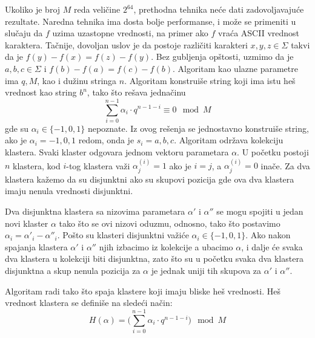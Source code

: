\noindent
\begin{minipage}[l]{\textwidth}

\end{minipage}

Ukoliko je broj $M$ reda veli\v cine $2^{64}$, prethodna tehnika ne\' ce dati zadovoljavaju\' ce rezultate. Naredna tehnika ima dosta bolje performanse, i mo\v ze se primeniti u slu\v caju da $f$ uzima uzastopne vrednosti, na primer ako $f$ vra\' ca ASCII vrednost karaktera. Ta\v cnije, dovoljan uslov je da postoje razli\v citi karakteri $x,y,z \in \Sigma$ takvi da je $f(y)-f(x) = f(z)-f(y)$. Bez gubljenja op\v stosti, uzmimo da je $a,b,c \in \Sigma$ i $f(b) - f(a) = f(c) - f(b)$. Algoritam kao ulazne parametre ima $q,M$, kao i du\v zinu stringa $n$. Algoritam konstrui\v se string koji ima istu he\v s vrednost kao string $b^n$, tako \v sto re\v sava jedna\v cinu
\begin{equation}
    \sum_{i=0}^{n-1} \alpha_i \cdot q^{n-1-i} \equiv 0 \mod M
\end{equation}
gde su $\alpha_i \in \{-1, 0, 1\}$ nepoznate. Iz ovog re\v senja se jednostavno konstrui\v se string, ako je $\alpha_i = -1,0,1$ redom, onda je $s_i = a,b,c$. Algoritam odr\v zava kolekciju klastera. Svaki klaster odgovara jednom vektoru parametara $\alpha$. U po\v cetku postoji $n$ klastera, kod $i$-tog klastera va\v zi $\alpha^{(i)}_j = 1$ ako je $i=j$, a $\alpha^{(i)}_j = 0$ ina\v ce. Za dva klastera ka\v zemo da su disjunktni ako su skupovi pozicija gde ova dva klastera imaju nenula vrednosti disjunktni.

Dva disjunktna klastera sa nizovima parametara $\alpha'$ i $\alpha''$ se mogu spojiti u jedan novi klaster $\alpha$ tako \v sto se ovi nizovi oduzmu, odnosno, tako \v sto postavimo $\alpha_i = \alpha'_i - \alpha''_i$. Po\v sto su klasteri disjunktni va\v zi\' ce $\alpha_i \in \{-1, 0, 1\}$. Ako nakon spajanja klastera $\alpha'$ i $\alpha''$ njih izbacimo iz kolekcije a ubacimo $\alpha$, i dalje \' ce svaka dva klastera u kolekciji biti disjunktna, zato \v sto su u po\v cetku svaka dva klastera disjunktna a skup nenula pozicija za $\alpha$ je jednak uniji tih skupova za $\alpha'$ i $\alpha''$.

Algoritam radi tako \v sto spaja klastere koji imaju bliske he\v s vrednosti. He\v s vrednost klastera se defini\v se na slede\' ci na\v cin:
\begin{equation}
    H(\alpha) = \Big(\sum_{i=0}^{n-1} \alpha_i \cdot q^{n-1-i}\Big) \mod M
\end{equation}


